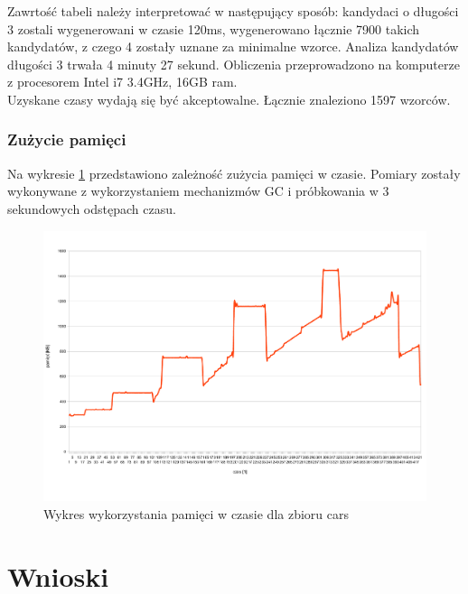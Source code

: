 \documentclass[a4paper,12pt]{article}
\begin{document}
\vspace{0.5cm}

Zawrtość tabeli należy interpretować w następujący sposób: kandydaci o długości 3 zostali wygenerowani w czasie 120ms, wygenerowano łącznie 7900 takich kandydatów, z czego 4 zostały uznane za minimalne wzorce. Analiza kandydatów długości 3 trwała 4 minuty 27 sekund. Obliczenia przeprowadzono na komputerze z procesorem Intel i7 3.4GHz, 16GB ram.\\

Uzyskane czasy wydają się być akceptowalne. Łącznie znaleziono 1597 wzorców.\\

\subsubsection{Zużycie pamięci}

Na wykresie \ref{pamiec} przedstawiono zależność zużycia pamięci w czasie. Pomiary zostały wykonywane z wykorzystaniem mechanizmów GC i próbkowania w 3 sekundowych odstępach czasu.

\begin{figure}[h!]
\begin{center}
\includegraphics[width=\textwidth]{img/pamiec.pdf}
\caption{Wykres wykorzystania pamięci w czasie dla zbioru cars}
\label{pamiec}
\end{center}
\end{figure}

\section{Wnioski}
\end{document}
